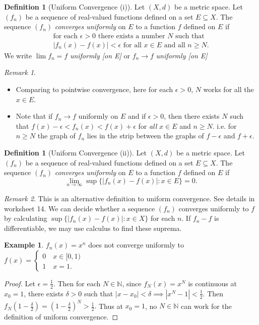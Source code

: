 \documentclass[12pt, lettersize]{book}
\theoremstyle{plain}
\theoremstyle{definition}
\newtheorem{dfn}[thm]{Definition}
\newtheorem*{eg}{Example}
\theoremstyle{remark}
\newtheorem*{rem}{Remark}
\newcommand{\N}{\mathbb{N}}
\begin{document}
			\begin{dfn}[Uniform Convergence (i)]
			Let $(X,d)$ be a metric space. Let $(f_n)$ be a sequence of real-valued functions defined on a set $E\subseteq X$. The sequence $(f_n)$ \emph{converges uniformly} on $E$ to a function $f$ defined on $E$ if
			\begin{align*}
				\text{for each $\epsilon>0$ there exists a number $N$ such that}\\
				\text{$|f_n(x)-f(x)|<\epsilon$ for all $x\in E$ and all $n\geq N$.}
			\end{align*}
			We write $\lim f_n=f$ \emph{uniformly [on E]} or $f_n\rightarrow f$ \emph{uniformly [on E]}
			\end{dfn}
			\begin{rem}
			\begin{itemize}
				\item Comparing to pointwise convergence, here for each $\epsilon>0$, $N$ works for all the $x\in E$.
				\item Note that if $f_n\rightarrow f$ uniformly on $E$ and if $\epsilon>0$, then there exists $N$ such that $f(x)-\epsilon<f_n(x)<f(x)+\epsilon$ for \emph{all} $x\in E$ and $n\geq N$. i.e. for $n\geq N$ the graph of $f_n$ lies in the strip between the graphs of $f-\epsilon$ and $f+\epsilon$.
			\end{itemize}
			\end{rem}
			
			\begin{dfn}[Uniform Convergence (ii)]
			Let $(X,d)$ be a metric space. Let $(f_n)$ be a sequence of real-valued functions defined on a set $E\subseteq X$. The sequence $(f_n)$ \emph{converges uniformly} on $E$ to a function $f$ defined on $E$ if
			\begin{displaymath}
				\lim\limits_{n\rightarrow\infty}\sup\{|f_n(x)-f(x)|: x\in E\}=0.
			\end{displaymath}
			\end{dfn}
			\begin{rem}
				This is an alternative definition to uniform convergence. See details in worksheet 14. We can decide whether a sequence $(f_n)$ converges uniformly to $f$ by calculating $\sup\{|f_n(x)-f(x)|: x\in X\}$ for each $n$. If $f_n-f$ is differentiable, we may use calculus to find these suprema.
			\end{rem}
			
			\begin{eg}
				$f_n(x)=x^n$ does not converge uniformly to $f(x)=\begin{cases}
					0\quad x\in[0,1)\\1\quad x=1.
				\end{cases}$
			\end{eg}
			\begin{proof}
				Let $\epsilon=\frac{1}{2}$. Then for each $N\in\N$, since $f_N(x)=x^N$ is continuous at $x_0=1$, there exists $\delta>0$ such that $|x-x_0|<\delta\implies|x^N-1|<\frac{1}{2}$. Then $f_N\left(1-\frac{\delta}{2}\right)=\left(1-\frac{\delta}{2}\right)^N>\frac{1}{2}.$ Thus at $x_0=1$, no $N\in\N$ can work for the definition of uniform convergence.
			\end{proof}
			
\end{document}
